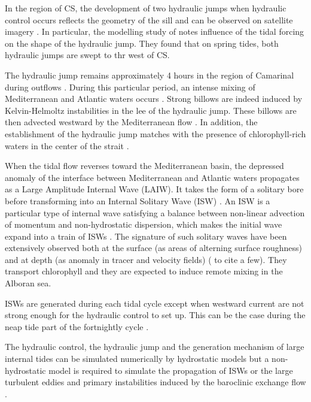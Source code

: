 In the region of CS, the development of two hydraulic jumps when hydraulic control occurs reflects the geometry of the sill and can be observed on satellite imagery \citep{brandt_1996,sanchez-garrido_2011}. In particular, the modelling study of \citet{sanchez-garrido_2011} notes influence of the tidal forcing on the shape of the hydraulic jump. They found that on spring tides, both hydraulic jumps are swept to thr west of CS.

The hydraulic jump remains approximately 4 hours in the region of Camarinal during outflows \citep{FA1988,vlasenko_2009}. During this particular period, an intense mixing of Mediterranean and Atlantic waters occurs \citep{wesson_1994,macias_2006,GarciaLafuente2011}. Strong billows are indeed induced by Kelvin-Helmoltz instabilities in the lee of the hydraulic jump. These billows are then advected westward by the Mediterranean flow \citep{wesson_1994}. In addition, the establishment of the hydraulic jump matches with the presence of chlorophyll-rich waters in the center of the strait \citep{bruno_2013}.

When the tidal flow reverses toward the Mediterranean basin, the depressed anomaly of the interface between Mediterranean and Atlantic waters propagates as a Large Amplitude Internal Wave (LAIW). It takes the form of a solitary bore before transforming into an Internal Solitary Wave (ISW) \citep{FA1988}. An ISW is a particular type of internal wave satisfying a balance between non-linear advection of momentum and non-hydrostatic dispersion, which makes the initial wave expand into a train of ISWs \citep{vlasenko_2000}. The signature of such solitary waves have been extensively observed both at the surface (as areas of alterning surface roughness) and at depth (as anomaly in tracer and velocity fields) (\citet{ziegenbein_1970,FA1988,watson_1990,sanchezgarrido_2008} to cite a few). They transport chlorophyll \citep{bruno_2013} and they are expected to induce remote mixing in the Alboran sea.

ISWs are generated during each tidal cycle except when westward current are not strong enough for the hydraulic control to set up. This can be the case during the neap tide part of the fortnightly cycle \citep{watson_1990}.

The hydraulic control, the hydraulic jump and the generation mechanism of large internal tides can be simulated numerically by hydrostatic models but a non-hydrostatic model is required to simulate the propagation of ISWs or the large turbulent eddies and primary instabilities induced by the baroclinic exchange flow \citep{brandt_1996,vlasenko_2009}.

